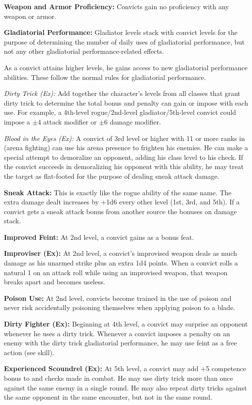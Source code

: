 {
\textbf{Weapon and Armor Proficiency:} Convicts gain no proficiency with any weapon or armor.

\textbf{Gladiatorial Performance:} Gladiator levels stack with convict levels for the purpose of determining the number of daily uses of gladiatorial performance, but not any other gladiatorial performance-related effects.

As a convict attains higher levels, he gains access to new gladiatorial performance abilities. These follow the normal rules for gladiatorial performance.

\textit{Dirty Trick (Ex):} Add together the character's levels from all classes that grant dirty trick to determine the total bonus and penalty can gain or impose with each use. For example, a 4th-level rogue/2nd-level gladiator/5th-level convict could impose a $\pm4$ attack modifier or $\pm6$ damage modifier.

\textit{Blood in the Eyes (Ex):} A convict of 3rd level or higher with 11 or more ranks in  (arena fighting) can use his arena presence to frighten his enemies. He can make a special attempt to demoralize an opponent, adding his class level to his  check. If the convict succeeds in demoralizing his opponent with this ability, he may treat the target as flat-footed for the purpose of dealing sneak attack damage.

\textbf{Sneak Attack:} This is exactly like the rogue ability of the same name. The extra damage dealt increases by +1d6 every other level (1st, 3rd, and 5th). If a convict gets a sneak attack bonus from another source the bonuses on damage stack.

\textbf{Improved Feint:} At 2nd level, a convict gains  as a bonus feat.

\textbf{Improviser (Ex):} At 2nd level, a convict's improvised weapon deals as much damage as his unarmed strike plus an extra 1d4 points. When a convict rolls a natural 1 on an attack roll while using an improvised weapon, that weapon breaks apart and becomes useless.

\textbf{Poison Use:} At 2nd level, convicts become trained in the use of poison and never risk accidentally poisoning themselves when applying poison to a blade.

\textbf{Dirty Fighter (Ex):} Beginning at 4th level, a convict may surprise an opponent whenever he uses a dirty trick. Whenever a convict imposes a penalty on an enemy with the dirty trick gladiatorial performance, he may use feint as a free action (see  skill).

\textbf{Experienced Scoundrel (Ex):} At 5th level, a convict may add +5 competence bonus to  and  checks made in combat. He may use dirty trick more than once against the same enemy in a single round. He may also repeat dirty tricks against the same opponent in the same encounter, but not in the same round.

}
